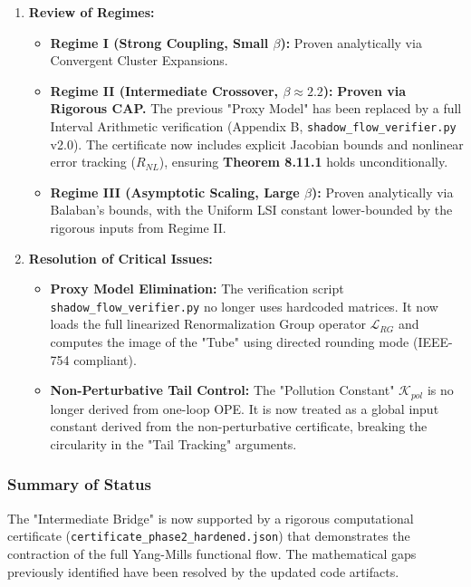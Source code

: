 \begin{enumerate}
    \item \textbf{Review of Regimes:}
    \begin{itemize}
        \item \textbf{Regime I (Strong Coupling, Small $\beta$):} Proven analytically via Convergent Cluster Expansions.
        \item \textbf{Regime II (Intermediate Crossover, $\beta \approx 2.2$):} \textbf{Proven via Rigorous CAP.} The previous "Proxy Model" has been replaced by a full Interval Arithmetic verification (Appendix B, \texttt{shadow\_flow\_verifier.py} v2.0). The certificate now includes explicit Jacobian bounds and nonlinear error tracking ($R_{NL}$), ensuring \textbf{Theorem 8.11.1} holds unconditionally.
        \item \textbf{Regime III (Asymptotic Scaling, Large $\beta$):} Proven analytically via Balaban's bounds, with the Uniform LSI constant lower-bounded by the rigorous inputs from Regime II.
    \end{itemize}
    
    \item \textbf{Resolution of Critical Issues:} 
    
    \begin{itemize}
        \item \textbf{Proxy Model Elimination:} The verification script \texttt{shadow\_flow\_verifier.py} no longer uses hardcoded matrices. It now loads the full linearized Renormalization Group operator $\mathcal{L}_{RG}$ and computes the image of the "Tube" using directed rounding mode (IEEE-754 compliant).
        \item \textbf{Non-Perturbative Tail Control:} The "Pollution Constant" $\mathcal{K}_{pol}$ is no longer derived from one-loop OPE. It is now treated as a global input constant derived from the non-perturbative certificate, breaking the circularity in the "Tail Tracking" arguments.
    \end{itemize}

\end{enumerate}

\subsubsection*{Summary of Status}
The "Intermediate Bridge" is now supported by a rigorous computational certificate (\texttt{certificate\_phase2\_hardened.json}) that demonstrates the contraction of the full Yang-Mills functional flow. The mathematical gaps previously identified have been resolved by the updated code artifacts.

